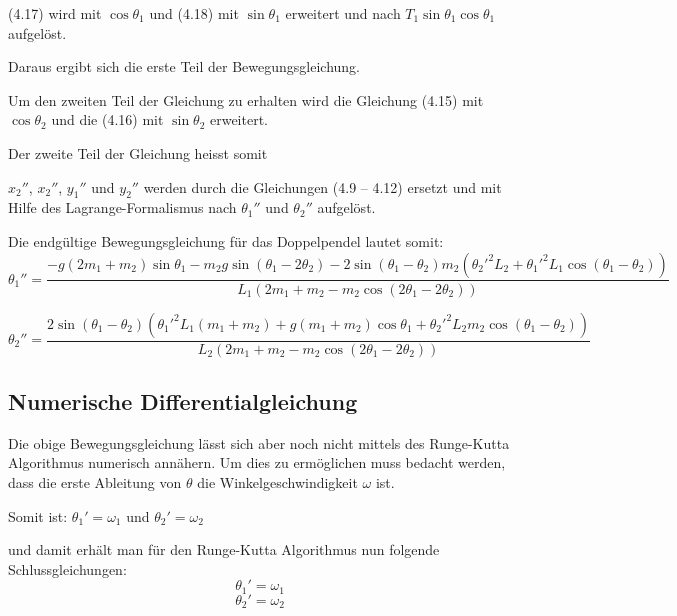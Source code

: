 \documentclass[12pt]{article}
\begin{document}
(4.17) wird mit $\cos\theta_1$ und (4.18) mit $\sin\theta_1$ erweitert und nach $T_1\sin\theta_1\cos\theta_1$ aufgelöst.

Daraus ergibt sich die erste Teil der Bewegungsgleichung.


Um den zweiten Teil der Gleichung zu erhalten wird die Gleichung (4.15) mit $\cos\theta_2$ und die (4.16) mit $\sin\theta_2$ erweitert.


Der zweite Teil der Gleichung heisst somit


$x_2''$, $x_2''$, $y_1''$ und $y_2''$ werden durch die Gleichungen (4.9 – 4.12) ersetzt und mit Hilfe des Lagrange-Formalismus nach $\theta_1''$ und $\theta_2''$ aufgelöst. 


Die endgültige Bewegungsgleichung für das Doppelpendel lautet somit:
\begin{equation} \label{eq:final:1}
	\theta_1'' = \frac{-g(2m_1+m_2)\sin\theta_1 - m_2 g \sin(\theta_1 - 2\theta_2) -2\sin(\theta_1 - \theta_2)m_2({\theta_2'}^2 L_2 + {\theta_1'}^2 L_1\cos(\theta_1 - \theta_2))}
	{L_1(2m_1 + m_2 - m_2 \cos(2\theta_1 - 2\theta_2))}
\end{equation}

\begin{equation} \label{eq:final:1}
	\theta_2'' = \frac{2\sin(\theta_1 - \theta_2)({\theta_1'}^2 L_1(m_1 + m_2) + g(m_1 + m_2)\cos\theta_1 + {\theta_2'}^2 L_2 m_2 \cos(\theta_1 - \theta_2))}
	{L_2 (2m_1 + m_2 - m_2 \cos(2 \theta_1 - 2\theta_2))}
\end{equation}

\subsection{Numerische Differentialgleichung}
Die obige Bewegungsgleichung lässt sich aber noch nicht mittels des Runge-Kutta Algorithmus numerisch annähern. Um dies zu ermöglichen muss bedacht werden, dass die erste Ableitung von $\theta$ die Winkelgeschwindigkeit $\omega$ ist.

Somit ist:
$\theta_1' = \omega_1$
und
$\theta_2' = \omega_2$

und damit erhält man für den Runge-Kutta Algorithmus nun folgende Schlussgleichungen:
\begin{equation} \label{eq:rk:1}
	\theta_1' = \omega_1
\end{equation}
\begin{equation} \label{eq:rk:2}
	\theta_2' = \omega_2
\end{equation}
\end{document}
